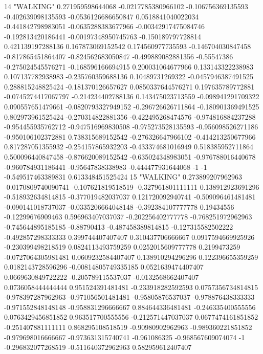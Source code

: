 14 "WALKING" 0.271959598644068 -0.0217785380966102 -0.106756369135593 -0.402639098135593 -0.0536126686650847 0.0518841040022034 -0.441842798983051 -0.0635288383677966 -0.00342917475084746 -0.192813420186441 -0.00197348950745763 -0.150189797728814 0.421139197288136 0.167873069152542 0.174560977735593 -0.146704030847458 -0.817865451864407 -0.824562683050847 -0.499889082881356 -0.55547386 -0.275024545576271 -0.168596166694915 0.200031064677966 0.133143322238983 0.107137782938983 -0.235760359688136 0.10489731269322 -0.0457946387491525 0.288815248825424 -0.181370126657627 0.0850337644576271 0.197635789772881 -0.0745274417067797 -0.214234402788136 0.143475023713559 -0.098941291709322 0.090557651479661 -0.0820793327949152 -0.296726626711864 -0.180901369491525 0.802973961525424 -0.270314822881356 -0.422495268474576 -0.974816884237288 -0.954455935762712 -0.947516969830508 -0.975273528135593 -0.956098526271186 -0.950106102372881 0.738315689152542 -0.276326647966102 -0.414213250677966 0.817287051355932 -0.254157865932203 -0.433374681016949 0.518385952711864 0.500096440847458 -0.876620089152542 -0.635024348983051 -0.976788016440678 -0.960784931186441 -0.95647838338983 -0.444477931644068 -1 -1 -0.549517463389831 0.613348451525424
15 "WALKING" 0.273899207962963 -0.0170809740090741 -0.107621819518519 -0.327961801111111 0.138912923691296 -0.518932634814815 -0.377019482037037 0.121720092940741 -0.509096461481481 -0.090141018737037 -0.0335206664048148 -0.392384107777778 0.19434556 -0.12299676909463 0.596963407037037 -0.202256402777778 -0.768251972962963 -0.745644895185185 -0.88790413 -0.487458389814815 -0.127315582502222 -0.492857298333333 0.399744407407407 0.310437706666667 0.0917594669925926 -0.230399498218519 0.0824113493759259 0.0252015609777778 0.2199473259 -0.0727064305981481 0.0609232584407407 0.138910294296296 0.122396655359259 0.0182143728596296 -0.00814805749335185 0.0521639474407407 0.0669630849722222 -0.205789115537037 -0.0132568662407407 0.0736058444444444 0.951524391481481 -0.233918282592593 0.0757356734814815 -0.978397287962963 -0.971056501481481 -0.95805876537037 -0.978876438333333 -0.971552848148148 -0.958831296666667 0.884644336481481 -0.246335400555556 0.0763429456851852 0.963517700555556 -0.212571447037037 0.0677474161851852 -0.251407881111111 0.868295108518519 -0.90980902962963 -0.989360221851852 -0.979698016666667 -0.973631315740741 -0.961086325 -0.968567609074074 -1 -0.296832077268519 -0.511640372962963 0.582959612407407
